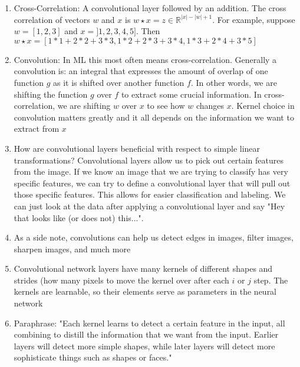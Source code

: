 \documentclass[a4paper, 11pt, oneside]{researchjournal} %
\begin{document}
\begin{enumerate}
    \item Cross-Correlation: A convolutional layer followed by an addition. The cross correlation of vectors $w$ and $x$ is $w \star x = z \in \mathbb{R}^{|x|-|w|+1}$. For example, suppose $w = [1,2,3]$ and $x = ]1,2,3,4,5]$. Then $w \star x = [1 * 1 + 2 * 2 + 3 * 3, 1 * 2 + 2 * 3 + 3 * 4, 1 * 3 + 2 * 4 + 3 * 5]$
    \item Convolution: In ML this most often means cross-correlation. Generally a convolution is: an integral that expresses the amount of overlap of one function $g$ as it is shifted over another function $f$. In other words, we are shifting the function $g$ over $f$ to extract some crucial information. In cross-correlation, we are shifting $w$ over $x$ to see how $w$ changes $x$. Kernel choice in convolution matters greatly and it all depends on the information we want to extract from $x$
    \item How are convolutional layers beneficial with respect to simple linear transformations? Convolutional layers allow us to pick out certain features from the image. If we know an image that we are trying to classify has very specific features, we can try to define a convolutional layer that will pull out those specific features. This allows for easier classification and labeling. We can just look at the data after applying a convolutional layer and say "Hey that looks like (or does not) this...". 
    \item As a side note, convolutions can help us detect edges in images, filter images, sharpen images, and much more
    \item Convolutional network layers have many kernels of different shapes and strides (how many pixels to move the kernel over after each $i$ or $j$ step. The kernels are learnable, so their elements serve as parameters in the neural network
    \item Paraphrase: "Each kernel learns to detect a certain feature in the input, all combining to distill the information that we want from the input. Earlier layers will detect more simple shapes, while later layers will detect more sophisticate things such as shapes or faces."
 \end{enumerate}
\end{document}
